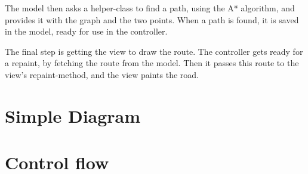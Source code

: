 The model then asks a helper-class to find a path, using the A* algorithm, and
provides it with the graph and the two points. When a path is found, it is saved
in the model, ready for use in the controller.

The final step is getting the view to draw the route. The controller gets ready
for a repaint, by fetching the route from the model. Then it passes this route
to the view's repaint-method, and the view paints the road.

\section{Simple Diagram}
\label{UML-SD}

\section{Control flow}
\label{UML-CF}